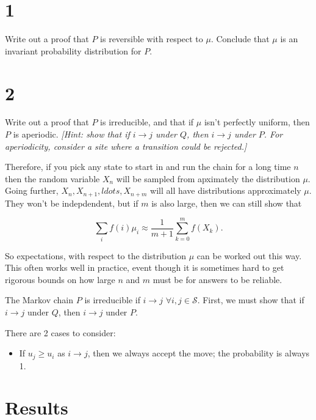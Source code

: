 \documentclass[6pt,oneside]{article}
\begin{document}
\section{1}

Write out a proof that $P$ is reversible with respect to $\mu$. Conclude that $\mu$ is an invariant
probability distribution for $P$.

\section{2}

Write out a proof that $P$ is irreducible, and that if $\mu$ isn't perfectly uniform, then $P$ is aperiodic.
\emph{[Hint: show that if $i\longrightarrow j$ under $Q$, then $i\longrightarrow j$ under $P$.
For aperiodicity, consider a site where a transition could be rejected.]}

Therefore, if you pick any state to start in and run the chain for a long time $n$ then the random
variable $X_n$ will be sampled from apximately the distribution $\mu$. Going further, $X_n,X_{n+1},
ldots, X_{n+m}$ will all have distributions approximately $\mu$. They won't be indepdendent, but
if $m$ is also large, then we can still show that

$$
\sum_i f(i)\mu_i \approx \frac{1}{m+1} \sum_{k=0}^m f(X_k).
$$

So expectations, with respect to the distribution $\mu$ can be worked out this way. This often works well in
practice, event though it is sometimes hard to get rigorous bounds on how large $n$ and $m$ must be for answers
to be reliable.

\vspace{10pt}

The Markov chain $P$ is irreducible if $i\longrightarrow j$ $\forall i,j\in\mathcal{S}$. First, we must show
that if $i\longrightarrow j$ under $Q$, then $i\longrightarrow j$ under $P$.

There are 2 cases to consider:

\begin{itemize}
    \item If $u_j \geq u_i$ as $i\longrightarrow j$, then we always accept the move; the probability is always 1.
\end{itemize}

\section{Results}
\end{document}
